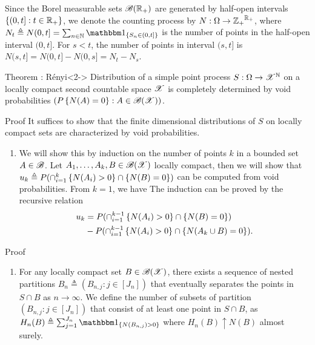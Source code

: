\documentclass[12pt,aspectratio=169]{beamer}
\begin{document}
\begin{frame}
\begin{Example} 
Since the Borel measurable sets $\mathscr{B}(\mathbb{R}_+)$ are generated by half-open intervals $\left\{(0,t]: t \in \mathbb{R}_+\right\}$, 
we denote the counting process by $N: \Omega \to {\mathbb{Z}_+}^{\mathbb{R}_+}$, 
where $N_t \triangleq N(0, t]= \sum_{n \in \N}\SetIn{S_n \in (0,t]}$ is the number of points in the half-open interval $(0,t]$. 
For $s < t$, the number of points in interval $(s,t]$ is $N(s,t] = N(0,t] - N(0,s] = N_t - N_s$. 
\end{Example}

\begin{block}{Theorem : R\'{e}nyi}<2->
\label{thm:void}
Distribution of a simple point process $S:\Omega\to\mathscr{X}^{\mathbb{N}}$ on a locally compact second countable space $\mathscr{X}$ is completely determined by void probabilities $(P\left\{N(A)=0\right\}: A \in \mathscr{B}(\mathscr{X}))$. 
\end{block}
\end{frame}


\begin{frame}
\begin{block}{Proof}
It suffices to show that the finite dimensional distributions of $S$ on locally compact sets are characterized by void probabilities. 
\begin{enumerate}
\item[\bf{Step 1:}]  
We will show this by induction on the number of points $k$ in a bounded set $A \in \mathscr{B}$. 
Let $A_1, \dots, A_k, B \in \mathscr{B}(\mathscr{X})$ locally compact, then we will show that $u_k \triangleq P(\cap_{i=1}^k\left\{N(A_i)> 0\right\}\cap\left\{N(B) = 0\right\})$ can be computed from void probabilities.
From $k=1$, we have 
The induction can be proved by the recursive relation 
\begin{align*}
u_k 
&= P(\cap_{i=1}^{k-1}\left\{N(A_i)> 0\right\}\cap\left\{N(B) = 0\right\}) \\
&- P(\cap_{i=1}^{k-1}\left\{N(A_i)> 0\right\}\cap\left\{N(A_k\cup B) = 0\right\}).
\end{align*}
\end{enumerate}
\end{block}
\end{frame}

\begin{frame}
\begin{block}{Proof}
\begin{enumerate}
\item[\bf{Step 2:}]  
For any locally compact set $B \in \mathscr{B}(\mathscr{X})$, there exists a sequence of nested partitions $B_n \triangleq (B_{n,j}: j \in [J_n])$ that eventually separates the points in $S\cap B$ as $n \to \infty$. 
We define the number of subsets of partition $(B_{n,j}: j \in [J_n])$ that consist of at least one point in $S\cap B$, as $H_n(B) \triangleq \sum_{j=1}^{J_n}\SetIn{N(B_{n,j}) > 0}$ where $H_n(B) \uparrow N(B)$ almost surely. 
\end{enumerate}
\end{block}
\end{frame}
\end{document}
